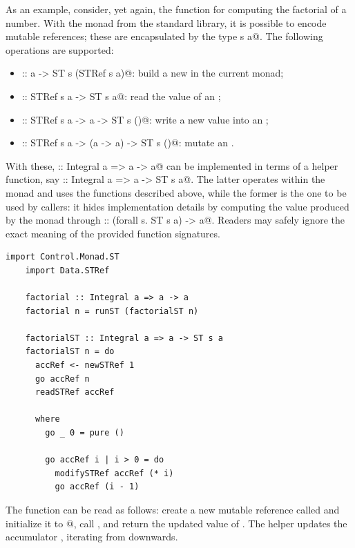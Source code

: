\documentclass[UdineBachThesis,american,11pt]{PhdThesis}
\begin{document}
  As an example, consider, yet again, the function for computing the factorial
  of a number. With the \lstinline@ST@ monad from the standard library, it is
  possible to encode mutable references; these are encapsulated by the type
  \lstinline@STRef s a@. The following operations are supported:

  \begin{itemize}
    \item \lstinline@newSTRef :: a -> ST s (STRef s a)@: build a new
    \lstinline@STRef@ in the current \lstinline@ST@ monad;

    \item \lstinline@readSTRef :: STRef s a -> ST s a@: read the value of an
    \lstinline@STRef@;

    \item \lstinline@writeSTRef :: STRef s a -> a -> ST s ()@: write a new value
    into an \lstinline@STRef@;

    \item \lstinline@modifySTRef :: STRef s a -> (a -> a) -> ST s ()@: mutate an
    \lstinline@STRef@.
  \end{itemize}

  With these, \lstinline@factorial :: Integral a => a -> a@ can be implemented
  in terms of a helper function, say
  \lstinline@factorialST :: Integral a => a -> ST s a@. The latter operates
  within the \lstinline@ST@ monad and uses the functions described above, while
  the former is the one to be used by callers: it hides implementation details
  by computing the value produced by the \lstinline@ST@ monad through
  \lstinline@runST :: (forall s. ST s a) -> a@. Readers may safely ignore the
  exact meaning of the provided function signatures.

  \begin{lstlisting}[gobble=4,basicstyle=\ttfamily\small]
    import Control.Monad.ST
    import Data.STRef

    factorial :: Integral a => a -> a
    factorial n = runST (factorialST n)

    factorialST :: Integral a => a -> ST s a
    factorialST n = do
      accRef <- newSTRef 1
      go accRef n
      readSTRef accRef

      where
        go _ 0 = pure ()

        go accRef i | i > 0 = do
          modifySTRef accRef (* i)
          go accRef (i - 1)
  \end{lstlisting}

  The function \lstinline@factorialST@ can be read as follows: create a new
  mutable reference called \lstinline@accRef@ and initialize it to
  @, call \lstinline@go@, and return the updated value of
  \lstinline@accRef@. The helper \lstinline@go@ updates the accumulator
  \lstinline@accRef@, iterating from \lstinline@n@ downwards.
\end{document}
